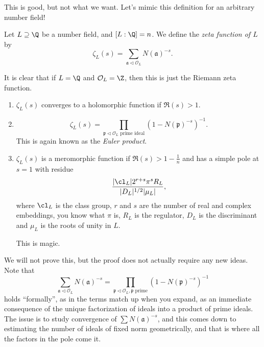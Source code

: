 \documentclass[a4paper]{article}
\begin{document}
This is good, but not what we want. Let's mimic this definition for an arbitrary number field!

\begin{defi}
  Let $L \supseteq \Q$ be a number field, and $[L:\Q] = n$. We define the \emph{zeta function of $L$} by
  \[
    \zeta_L(s) = \sum_{\mathfrak{a} \lhd \mathcal{O}_L} N(\mathfrak{a})^{-s}.
  \]
\end{defi}
It is clear that if $L = \Q$ and $\mathcal{O}_L = \Z$, then this is just the Riemann zeta function.

\begin{thm}\leavevmode
  \begin{enumerate}
    \item $\zeta_L(s)$ converges to a holomorphic function if $\Re(s) > 1$.
      \setcounter{enumi}{2}
    \item
      \[
        \zeta_L(s) = \prod_{\mathfrak{p} \lhd \mathcal{O}_L\text{ prime ideal}} (1 - N(\mathfrak{p})^{-s})^{-1}.
      \]
      This is again known as the \emph{Euler product}.
      \setcounter{enumi}{1}
    \item $\zeta_L(s)$ is a meromorphic function if $\Re(s) > 1 - \frac{1}{n}$ and has a simple pole at $s = 1$ with residue
      \[
        \frac{|\cl_L| 2^{r + s} \pi^s R_L}{|D_L|^{1/2} |\mu_L|},
      \]
      where $\cl_L$ is the class group, $r$ and $s$ are the number of real and complex embeddings, you know what $\pi$ is, $R_L$ is the regulator, $D_L$ is the discriminant and $\mu_L$ is the roots of unity in $L$.

      This is magic.
  \end{enumerate}
\end{thm}
We will not prove this, but the proof does not actually require any new ideas. Note that
\[
  \sum_{\mathfrak{a} \lhd \mathcal{O}_L} N(\mathfrak{a})^{-s} = \prod_{\mathfrak{p} \lhd \mathcal{O}_L,\mathfrak{p}\text{ prime}} (1 - N(\mathfrak{p})^{-s})^{-1}
\]
holds ``formally'', as in the terms match up when you expand, as an immediate consequence of the unique factorization of ideals into a product of prime ideals. The issue is to study convergence of $\sum N(\mathfrak{a})^{-s}$, and this comes down to estimating the number of ideals of fixed norm geometrically, and that is where all the factors in the pole come it.
\end{document}
